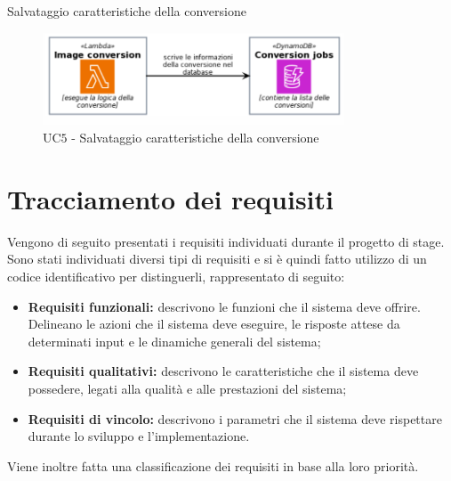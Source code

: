 \begin{usecase}{5}{Salvataggio caratteristiche della conversione}
    \begin{figure}[H]
        \centering
        \includegraphics[width=0.8\textwidth]{images/uc5.png}
        \caption{UC$5$ - Salvataggio caratteristiche della conversione}
    \end{figure}
    \label{uc:salvataggio-caratteristiche}
\end{usecase}

\section{Tracciamento dei requisiti}

Vengono di seguito presentati i requisiti individuati durante il progetto di
stage.\\
Sono stati individuati diversi tipi di requisiti e si è quindi fatto utilizzo di
un codice identificativo per distinguerli, rappresentato di seguito:
\begin{itemize}
    \item \textbf{Requisiti funzionali:} descrivono le funzioni che il sistema
          deve offrire. Delineano le azioni che il sistema deve eseguire, le
          risposte attese da determinati input e le dinamiche generali del sistema;
    \item \textbf{Requisiti qualitativi:} descrivono le caratteristiche che il
          sistema deve possedere, legati alla qualità e alle prestazioni del sistema;
    \item \textbf{Requisiti di vincolo:} descrivono i parametri che il sistema
          deve rispettare durante lo sviluppo e l'implementazione.
\end{itemize}
Viene inoltre fatta una classificazione dei requisiti in base alla loro
priorità.

